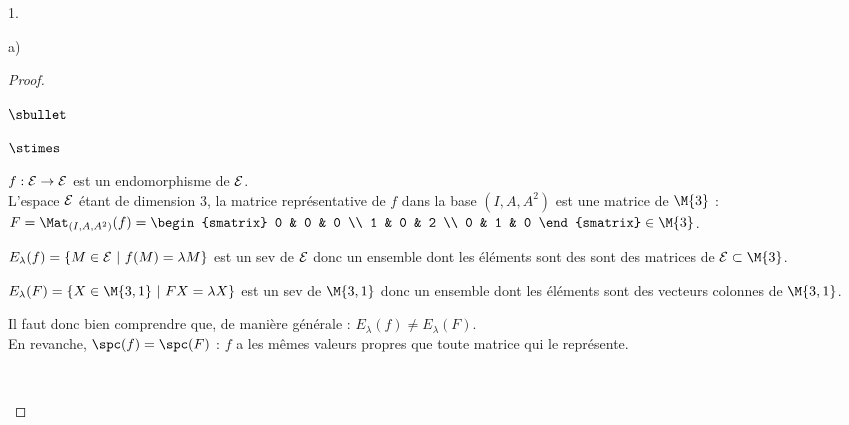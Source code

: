 \begin{noliste}{1.}
\begin{noliste}{a)}
\begin{proof}
\begin{noliste}{$\sbullet$}
\begin{remark}
\begin{noliste}{$\stimes$}
          \item $f : {\cal E} \to {\cal E}$ est un endomorphisme de
            ${\cal E}$.\\[.2cm]
            L'espace ${\cal E}$ étant de dimension $3$, la matrice
            représentative de $f$ dans la base $(I, A, A^2)$ est une
            matrice de $\M{3}$ : $F = \Mat_{(I,A, A^2)}(f) =
            \begin{smatrix}
              0 & 0 & 0 \\
              1 & 0 & 2 \\
              0 & 1 & 0
            \end{smatrix}
            \in \M{3}$.

          \item $E_\lambda(f) = \{ M \in {\cal E} \ | \ f(M) =
            \lambda M\}$ est un sev de ${\cal E}$ donc un ensemble
            dont les éléments sont des sont des matrices de ${\cal E}
            \subset \M{3}$.
            
          \item $E_\lambda(F) = \{ X \in \M{3,1} \ | \ FX = \lambda
            X\}$ est un sev de $\M{3,1}$ donc un ensemble dont les
            éléments sont des vecteurs colonnes de $\M{3,1}$.
          \end{noliste}
          Il faut donc bien comprendre que, de manière générale :
          $E_\lambda(f) \neq E_\lambda(F)$.\\
          En revanche, $\spc(f) = \spc(F)$ : $f$ a les mêmes valeurs
          propres que toute matrice qui le représente.
    \end{remark}~\\[-1cm]
    

\end{noliste}
\end{proof}
\end{noliste}
\end{noliste}
